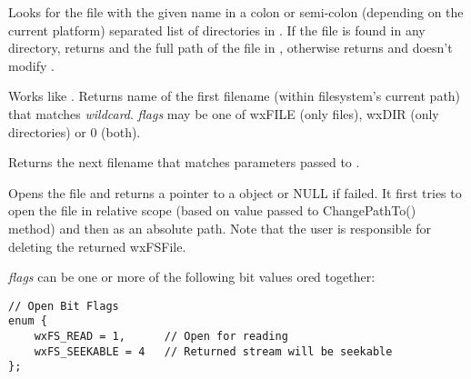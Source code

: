 \label{wxfilesystemfindfileinpath}


Looks for the file with the given name  in a colon or semi-colon
(depending on the current platform) separated list of directories in
. If the file is found in any directory, returns \true and the full
path of the file in , otherwise returns \false and doesn't modify 
.






\label{wxfilesystemfindfirst}


Works like . Returns name of the first
filename (within filesystem's current path) that matches {\it wildcard}. {\it flags} may be one of
wxFILE (only files), wxDIR (only directories) or 0 (both).


\label{wxfilesystemfindnext}


Returns the next filename that matches parameters passed to .


\label{wxfilesystemopenfile}


Opens the file and returns a pointer to a  object
or NULL if failed. It first tries to open the file in relative scope
(based on value passed to ChangePathTo() method) and then as an
absolute path.  Note that the user is responsible for deleting the returned
wxFSFile.  

{\it flags} can be one or more of the following bit values ored together:

\begin{verbatim}
// Open Bit Flags
enum {
    wxFS_READ = 1,      // Open for reading
    wxFS_SEEKABLE = 4   // Returned stream will be seekable
};
\end{verbatim}

